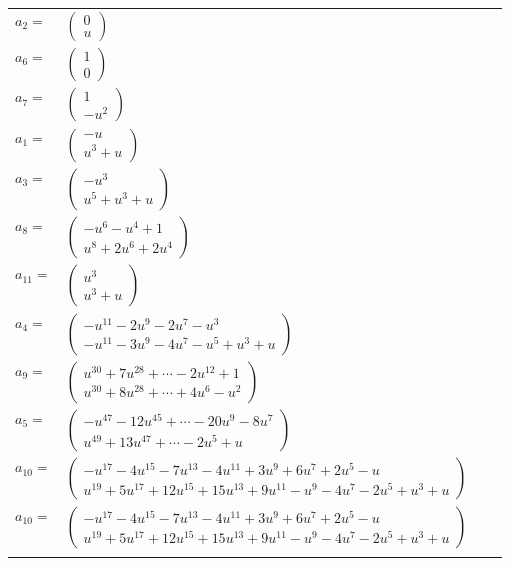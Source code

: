 \documentclass[1p]{elsarticle_modified}
\theoremstyle{definition}
\begin{document}
\begin{tabular}{m{7pt} m{180pt} m{7pt} m{180pt} }
\flushright $a_{2}=$&$\begin{pmatrix}0\\u\end{pmatrix}$ \\
\flushright $a_{6}=$&$\begin{pmatrix}1\\0\end{pmatrix}$ \\
\flushright $a_{7}=$&$\begin{pmatrix}1\\- u^2\end{pmatrix}$ \\
\flushright $a_{1}=$&$\begin{pmatrix}- u\\u^3+u\end{pmatrix}$ \\
\flushright $a_{3}=$&$\begin{pmatrix}- u^3\\u^5+u^3+u\end{pmatrix}$ \\
\flushright $a_{8}=$&$\begin{pmatrix}- u^6- u^4+1\\u^8+2 u^6+2 u^4\end{pmatrix}$ \\
\flushright $a_{11}=$&$\begin{pmatrix}u^3\\u^3+u\end{pmatrix}$ \\
\flushright $a_{4}=$&$\begin{pmatrix}- u^{11}-2 u^9-2 u^7- u^3\\- u^{11}-3 u^9-4 u^7- u^5+u^3+u\end{pmatrix}$ \\
\flushright $a_{9}=$&$\begin{pmatrix}u^{30}+7 u^{28}+\cdots-2 u^{12}+1\\u^{30}+8 u^{28}+\cdots+4 u^6- u^2\end{pmatrix}$ \\
\flushright $a_{5}=$&$\begin{pmatrix}- u^{47}-12 u^{45}+\cdots-20 u^9-8 u^7\\u^{49}+13 u^{47}+\cdots-2 u^5+u\end{pmatrix}$ \\
\flushright $a_{10}=$&$\begin{pmatrix}- u^{17}-4 u^{15}-7 u^{13}-4 u^{11}+3 u^9+6 u^7+2 u^5- u\\u^{19}+5 u^{17}+12 u^{15}+15 u^{13}+9 u^{11}- u^9-4 u^7-2 u^5+u^3+u\end{pmatrix}$\\ \flushright $a_{10}=$&$\begin{pmatrix}- u^{17}-4 u^{15}-7 u^{13}-4 u^{11}+3 u^9+6 u^7+2 u^5- u\\u^{19}+5 u^{17}+12 u^{15}+15 u^{13}+9 u^{11}- u^9-4 u^7-2 u^5+u^3+u\end{pmatrix}$\\&\end{tabular}
\end{document}
